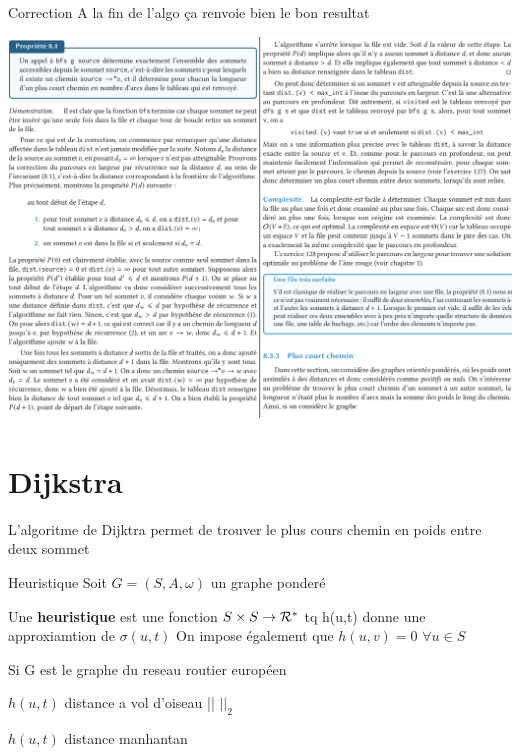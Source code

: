 \documentclass[a4paper,french,bookmarks]{article}
\begin{document}
    \begin{theorem}{Correction}{}
        A la fin de l'algo ça renvoie bien le bon resultat  
    \end{theorem}
    \begin{nproof}
        \includegraphics[scale=0.5]{MPI - Informatique/Cours/Dessin/ProofBFS.jpeg}
    \end{nproof}
    
    \section{Dijkstra }
    
    L'algoritme de Dijktra permet de trouver le plus cours chemin en poids entre deux sommet  

    \begin{definition}{Heuristique}{}
        Soit $G = (S,A,\omega)$ un graphe ponderé
        
        Une \textbf{heuristique} est une fonction $S \times S \to \mathcal{R}^*$ tq h(u,t) donne une approxiamtion de $\sigma(u,t)$ 
        On impose également que $h(u,v) = 0$   $\forall u\in S$
    \end{definition}
    \begin{example}{}{}
        Si G est le graphe du reseau routier européen
        \begin{enumerate}
            \itt $h(u,t)$ distance a vol d'oiseau || $||_2$
    
            \itt $h(u,t)$ distance manhantan
            
            
        \end{enumerate}
    \end{example}
    
\end{document}
